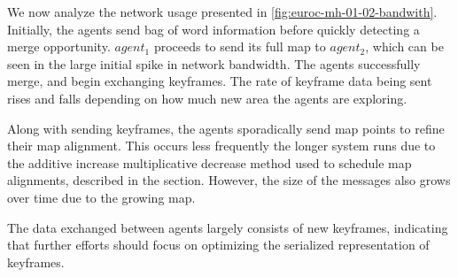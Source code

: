 We now analyze the network usage presented in \autoref{fig:euroc-mh-01-02-bandwith}. Initially, the agents send bag of word information before quickly detecting a merge opportunity. $agent_1$ proceeds to send its full map to $agent_2$, which can be seen in the large initial spike in network bandwidth. The agents successfully merge, and begin exchanging keyframes. The rate of keyframe data being sent rises and falls depending on how much new area the agents are exploring.

Along with sending keyframes, the agents sporadically send map points to refine their map alignment. This occurs less frequently the longer system runs due to the additive increase multiplicative decrease method used to schedule map alignments, described in the  section. However, the size of the messages also grows over time due to the growing map.

The data exchanged between agents largely consists of new keyframes, indicating that further efforts should focus on optimizing the serialized representation of keyframes.

